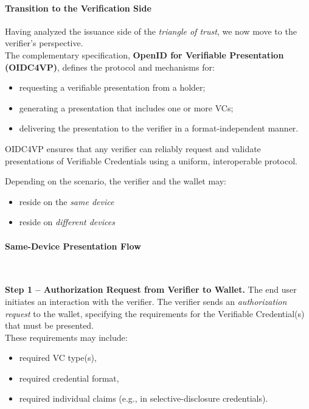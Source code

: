 \paragraph{Transition to the Verification Side}
Having analyzed the issuance side of the \emph{triangle of trust}, we now move to the verifier’s perspective. \\ 
The complementary specification, \textbf{OpenID for Verifiable Presentation (OIDC4VP)}, defines the protocol and mechanisms for:
\begin{itemize}
    \item requesting a verifiable presentation from a holder;
    \item generating a presentation that includes one or more VCs;
    \item delivering the presentation to the verifier in a format-independent manner.
\end{itemize}

\noindent
OIDC4VP ensures that any verifier can reliably request and validate presentations of Verifiable Credentials using a uniform, interoperable protocol.

\bigskip

\noindent
Depending on the scenario, the verifier and the wallet may:
\begin{itemize}
    \item reside on the \emph{same device}
    \item reside on \emph{different devices}
\end{itemize}

\paragraph{Same-Device Presentation Flow} ~

\noindent
\textbf{Step 1 – Authorization Request from Verifier to Wallet.}  
The end user initiates an interaction with the verifier.  
The verifier sends an \emph{authorization request} to the wallet, specifying the requirements for the Verifiable Credential(s) that must be presented. \\
These requirements may include:
\begin{itemize}
    \item required VC type(s),
    \item required credential format,
    \item required individual claims (e.g., in selective-disclosure credentials).
\end{itemize}
\medskip

